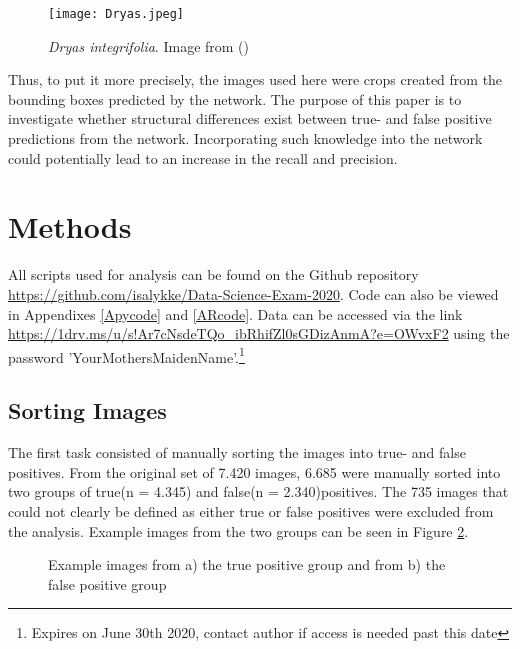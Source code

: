 \documentclass[12pt]{article}
\begin{document}
\begin{figure}[h]
	\begin{center}
		\texttt{[image: Dryas.jpeg]}
	\end{center}
	\caption{\textit{Dryas integrifolia}. Image from (\cite{DryasIntegrifolia2020})}
	\label{fig:dryas}
\end{figure}

Thus, to put it more precisely, the images used here were crops created from the bounding boxes predicted by the network. The purpose of this paper is to investigate whether structural differences exist between true- and false positive predictions from the network. Incorporating such knowledge into the network could potentially lead to an increase in the recall and precision.

\section{Methods}
All scripts used for analysis can be found on the Github repository \url{https://github.com/isalykke/Data-Science-Exam-2020}. Code can also be viewed in Appendixes \ref{Apycode} and \ref{ARcode}. Data can be accessed via the link \url{https://1drv.ms/u/s!Ar7cNsdeTQo_ibRhifZl0sGDizAnmA?e=OWvxF2} using the password 'YourMothersMaidenName'.\footnote{Expires on June 30th 2020, contact author if access is needed past this date}

\subsection{Sorting Images}
The first task consisted of manually sorting the images into true- and false positives. 
From the original set of 7.420 images, 6.685 were manually sorted into two groups of true(n = 4.345) and false(n = 2.340)positives. The 735 images that could not clearly be defined as either true or false positives were excluded from the analysis. Example images from the two groups can be seen in Figure \ref{fig:groupex}.


\begin{figure}[ht]
	\begin{center}
		\hfill
		\caption{Example images from a) the true positive group and from b) the false positive group} 
		\label{fig:groupex}
	\end{center}
\end{figure}
\end{document}
